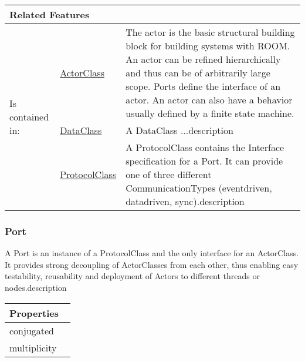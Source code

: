 			
			\vspace{\baselineskip}
			\begingroup
			\renewcommand{\arraystretch}{1.8} %
			\parbox{\textwidth}{
			\begin{longtable}{l l p{}}
				\multicolumn{2}{l}{\textbf{\large Related Features}} & \\
				\hline
			\multirow{3}{*}{Is contained in:} & \tabitem \hyperlink{ref:ActorClass}{ActorClass}  & The actor is the basic structural building block for building systems with ROOM. An actor can be refined hierarchically and thus can be of arbitrarily large scope. Ports define the interface of an actor. An actor can also have a behavior usually defined by a finite state machine. \\
			& \tabitem \hyperlink{ref:DataClass}{DataClass}  & A DataClass ...description  \\
			& \tabitem \hyperlink{ref:ProtocolClass}{ProtocolClass}  & A ProtocolClass contains the Interface specification for a Port. It can provide one of three different CommunicationTypes (eventdriven, datadriven, sync).description  \\
			\hline
			\end{longtable}	
			}
			\endgroup
			\vspace{\baselineskip}
			
			
		
		\subsubsection{Port}
			\hypertarget{ref:Port}{}
			
			A Port is an instance of a ProtocolClass and the only interface for an ActorClass. It provides strong decoupling of ActorClasses from each other, thus enabling easy testability, reusability and deployment of Actors to different threads or nodes.description 
			
			\vspace{\baselineskip}
			\begingroup
			\renewcommand{\arraystretch}{1.8} %
			\parbox{\textwidth}{
			\begin{longtable}{l p{}}
				\multicolumn{2}{l}{\textbf{\large Properties}} \\
				\hline
			\tabitem conjugated & \\
			\tabitem multiplicity & \\
			\end{longtable}	
			}
			\endgroup
			\vspace{\baselineskip}
			
